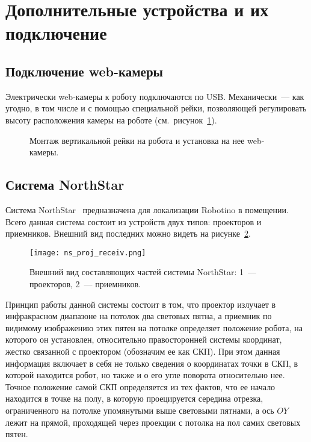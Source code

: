 \newpage
\section{Дополнительные устройства и их подключение}
\subsection{Подключение web-камеры}
Электрически web-камеры к роботу подключаются по USB.
Механически~--- как угодно, в том числе и с помощью специальной рейки, позволяющей регулировать высоту расположения камеры на роботе (см.~рисунок~\ref{img_web_cam_connection}).

\begin{figure}[h]
	\begin{minipage}[h]{0.49\linewidth}
	\end{minipage}
	\hfill
	\begin{minipage}[h]{0.49\linewidth}
	\end{minipage}
	\caption{Монтаж вертикальной рейки на робота и установка на нее web-камеры.}
	\label{img_web_cam_connection}
\end{figure}



\subsection{Система NorthStar}
Система NorthStar~\cite{northstar_manual} предназначена для локализации Robotino в помещении.
Всего данная система состоит из устройств двух типов: проекторов и приемников.
Внешний вид последних можно видеть на рисунке~\ref{img_NSs_projector_and_receivers}.

\begin{figure}[h]
	\centering
	\texttt{[image: ns\_proj\_receiv.png]}
	\caption{Внешний вид составляющих частей системы NorthStar: 1~--- проекторов, 2~--- приемников.}
	\label{img_NSs_projector_and_receivers}
\end{figure}

Принцип работы данной системы состоит в том, что проектор излучает в инфракрасном диапазоне на потолок два световых пятна, а приемник по видимому изображению этих пятен на потолке определяет положение робота, на которого он установлен, относительно правосторонней системы координат, жестко связанной с проектором (обозначим ее как СКП).
При этом данная информация включает в себя не только сведения о координатах точки в СКП, в которой находится робот, но также и о его угле поворота относительно нее.
Точное положение самой СКП определяется из тех фактов, что ее начало находится в точке на полу, в которую проецируется середина отрезка, ограниченного на потолке упомянутыми выше световыми пятнами, а ось $OY$ лежит на прямой, проходящей через проекции с потолка на пол самих световых пятен.

